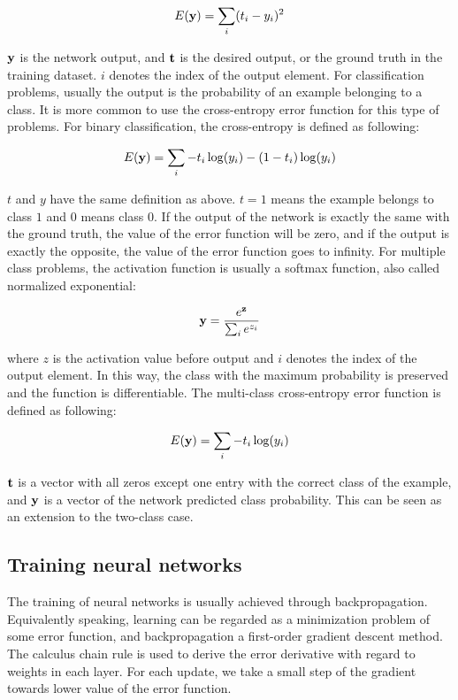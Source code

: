 \begin{equation}
E(\mathbf{y}) = \sum_i (t_i - y_i)^2
\end{equation}

$\mathbf{y}$ is the network output, and $\mathbf{t}$ is the desired output, or the ground truth in the training dataset. $i$ denotes the index of the output element. For classification problems, usually the output is the probability of an example belonging to a class. It is more common to use the cross-entropy error function for this type of problems. For binary classification, the cross-entropy is defined as following:

\begin{equation}
E(\mathbf{y}) = \sum_i  - t_i \log(y_i) - (1 - t_i) \log(y_i)
\end{equation}

$t$ and $y$ have the same definition as above. $t = 1$ means the example belongs to class $1$ and $0$ means class $0$. If the output of the network is exactly the same with the ground truth, the value of the error function will be zero, and if the output is exactly the opposite, the value of the error function goes to infinity. For multiple class problems, the activation function is usually a softmax function, also called normalized exponential:

\begin{equation}
\mathbf{y} = \dfrac{e^{\mathbf{z}}}{\sum_i e^{z_i}}
\end{equation}

where $z$ is the activation value before output and $i$ denotes the index of the output element. In this way, the class with the maximum probability is preserved and the function is differentiable. The multi-class cross-entropy error function is defined as following:

\begin{equation}
E(\mathbf{y}) = \sum_i -t_i \log(y_i)
\end{equation}

$\mathbf{t}$ is a vector with all zeros except one entry with the correct class of the example, and $\mathbf{y}$ is a vector of the network predicted class probability. This can be seen as an extension to the two-class case.

\subsection{Training neural networks}
The training of neural networks is usually achieved through backpropagation. Equivalently speaking, learning can be regarded as a minimization problem of some error function, and backpropagation a first-order gradient descent method. The calculus chain rule is used to derive the error derivative with regard to weights in each layer. For each update, we take a small step of the gradient towards lower value of the error function.

